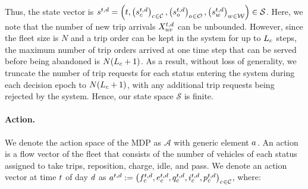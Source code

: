 Thus, the state vector is $s^{t, d}= \left(t, \left(s_{c_{}}^{t,d} \right)_{c_{} \in \mathcal{C}}, \left(s_{o_{}}^{t,d} \right)_{o_{} \in \mathcal{O}}, \left(s_{w_{}}^{t,d} \right)_{w_{} \in \mathcal{W}} \right) \in \mathcal{S}$. Here, we note that the number of new trip arrivals $X_{uv}^{t, d}$ can be unbounded. However, since the fleet size is $N$ and a trip order can be kept in the system for up to $L_c$ steps, the maximum number of trip orders arrived at one time step that can be served before being abandoned is $N(L_c+1)$. As a result, without loss of generality, we truncate the number of trip requests for each status entering the system during each decision epoch to $N(L_c + 1)$, with any additional trip requests being rejected by the system. Hence, our state space $\mathcal{S}$ is finite.

\paragraph{Action.} We denote the action space of the MDP as $\mathcal{A}$ with generic element $a^{}_{}$. An action is a flow vector of the fleet that consists of the number of vehicles of each status assigned to take trips, reposition, charge, idle, and pass. 
We denote an action vector at time $t$ of day $d$ as $a^{t,d}_{} := \left(f^{t,d}_{c_{}}, e^{t,d}_{c_{}}, q^{t,d}_{c_{}}, i^{t,d}_{c_{}}, p^{t,d}_{c_{}}\right)_{c_{} \in \mathcal{C}}$, where: 

